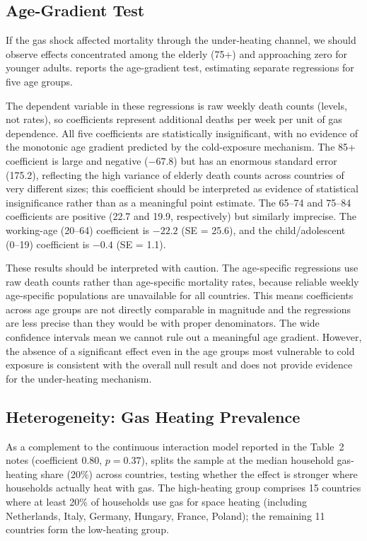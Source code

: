 \documentclass[12pt]{article}
\begin{document}
\subsection{Age-Gradient Test}

If the gas shock affected mortality through the under-heating channel, we should observe effects concentrated among the elderly (75+) and approaching zero for younger adults.  reports the age-gradient test, estimating separate regressions for five age groups.



The dependent variable in these regressions is raw weekly death counts (levels, not rates), so coefficients represent additional deaths per week per unit of gas dependence. All five coefficients are statistically insignificant, with no evidence of the monotonic age gradient predicted by the cold-exposure mechanism. The 85+ coefficient is large and negative ($-67.8$) but has an enormous standard error (175.2), reflecting the high variance of elderly death counts across countries of very different sizes; this coefficient should be interpreted as evidence of statistical insignificance rather than as a meaningful point estimate. The 65--74 and 75--84 coefficients are positive (22.7 and 19.9, respectively) but similarly imprecise. The working-age (20--64) coefficient is $-22.2$ (SE = 25.6), and the child/adolescent (0--19) coefficient is $-0.4$ (SE = 1.1).

These results should be interpreted with caution. The age-specific regressions use raw death counts rather than age-specific mortality rates, because reliable weekly age-specific populations are unavailable for all countries. This means coefficients across age groups are not directly comparable in magnitude and the regressions are less precise than they would be with proper denominators. The wide confidence intervals mean we cannot rule out a meaningful age gradient. However, the absence of a significant effect even in the age groups most vulnerable to cold exposure is consistent with the overall null result and does not provide evidence for the under-heating mechanism.

\subsection{Heterogeneity: Gas Heating Prevalence}



As a complement to the continuous interaction model reported in the Table~2 notes (coefficient 0.80, $p = 0.37$),  splits the sample at the median household gas-heating share (20\%) across countries, testing whether the effect is stronger where households actually heat with gas. The high-heating group comprises 15 countries where at least 20\% of households use gas for space heating (including Netherlands, Italy, Germany, Hungary, France, Poland); the remaining 11 countries form the low-heating group.
\end{document}
